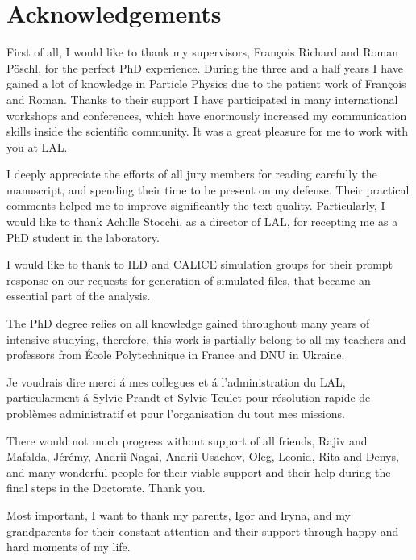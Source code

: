 \section*{Acknowledgements}
First of all, I would like to thank my supervisors, Fran\c cois Richard and Roman P\"oschl, for the perfect PhD experience. 
During the three and a half years I have gained a lot of knowledge in Particle Physics due to the patient work of Fran\c cois and Roman. 
Thanks to their support I have participated in many international workshops and conferences, which have enormously increased my communication skills inside the scientific community. 
It was a great pleasure for me to work with you at LAL. 


I deeply appreciate the efforts of all jury members for reading carefully the manuscript, and spending their time to be present on my defense. Their practical comments helped me to improve significantly the text quality. 
Particularly, I would like to thank Achille Stocchi, as a director of LAL, for  recepting me as a PhD student in the laboratory.

I would like to thank to ILD and CALICE simulation groups for their prompt response on our requests for generation of simulated files, that became an essential part of the analysis. 

The PhD degree relies on all knowledge gained throughout many years of intensive studying, therefore, this work is partially belong to all my teachers and professors from \'Ecole Polytechnique in France and DNU in Ukraine. 

Je voudrais dire merci \'a mes collegues et \'a l'administration du LAL, particularment \'a Sylvie Prandt et Sylvie Teulet pour résolution rapide de problèmes administratif et pour l'organisation du tout mes missions.

There would not much progress without support of all friends, Rajiv and Mafalda, J\'er\'emy, Andrii Nagai, Andrii Usachov, Oleg, Leonid, Rita and Denys, and many wonderful people for their viable support and their help during the final steps in the Doctorate. Thank you. 

Most important, I want to thank my parents, Igor and Iryna, and my grandparents for their constant attention and their support through happy and hard moments of my life.  